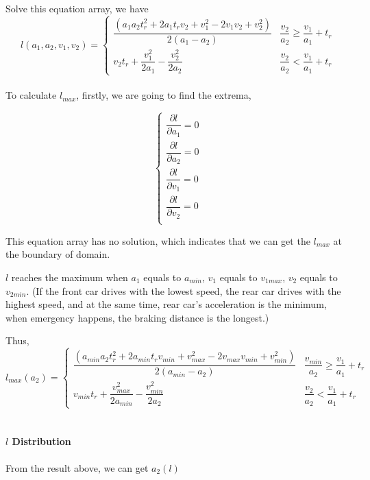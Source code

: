 Solve this equation array, we have
\begin{displaymath}
l(a_1, a_2, v_1, v_2) = 
\left \{
\begin{array}{cl}
\dfrac{(a_1a_2t_r^2 + 2a_1t_rv_2 + v_1^2 - 2v_1v_2 + v_2^2)}{2(a_1-a_2)} & \dfrac{v_2}{a_2}  \geq \dfrac{v_1}{a_1} + t_r \\
v_2 t_r + \dfrac{v_1 ^ 2}{2a_1} -\dfrac{v_2^2}{2a_2} & \dfrac{v_2}{a_2}  < \dfrac{v_1}{a_1} + t_r
\end{array}
\right .
\end{displaymath}
\\

To calculate $l_{max}$, firstly, we are going to find the extrema,

\begin{displaymath}
\left \{
\begin{array}{cl}
\dfrac{\partial l}{\partial{a_1}} = 0 \\
\dfrac{\partial l}{\partial{a_2}} = 0 \\
\dfrac{\partial l}{\partial{v_1}} = 0 \\
\dfrac{\partial l}{\partial{v_2}} = 0 \\
\end{array}
\right .
\end{displaymath}

This equation array has no solution, which indicates that we can 
get the $l_{max}$ at the boundary of domain.

$l$ reaches the maximum when $a_1$ equals to $a_{min}$, { }$v_1$ 
equals to $v_{1max}$, $v_2$ equals to $v_{2min}$. (If the front 
car drives with the lowest speed, the rear car drives with the 
highest speed, and at the same time, rear car's acceleration is 
the minimum, when emergency happens, the braking distance is 
the longest.)

Thus,
\begin{displaymath}
l_{max}(a_2) = 
\left \{
\begin{array}{cl}
\dfrac{(a_{min}a_2t_r^2 + 2a_{min}t_rv_{min} + v_{max}^2 - 2v_{max}v_{min} + v_{min}^2)}{2(a_{min}-a_2)} & \dfrac{v_{min}}{a_2}  \geq \dfrac{v_1}{a_1} + t_r \\
v_{min} t_r + \dfrac{v_{max} ^ 2}{2a_{min}} -\dfrac{v_{min}^2}{2a_2} & \dfrac{v_2}{a_2}  < \dfrac{v_1}{a_1} + t_r
\end{array}
\right .
\end{displaymath}\\

\paragraph{$l${ } Distribution}
From the result above, we can get $a_2(l)$


